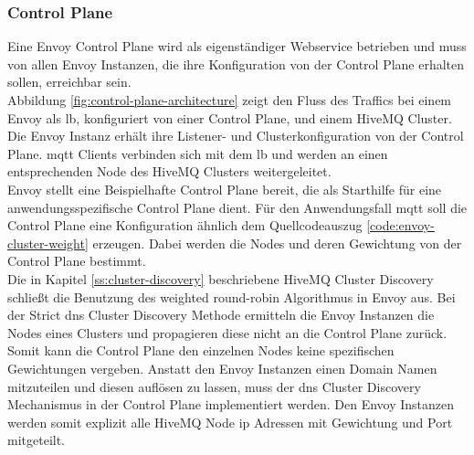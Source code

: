 \subsubsection{Control Plane} \label{ss:control-plane}
Eine Envoy Control Plane wird als eigenständiger Webservice betrieben und muss von allen Envoy Instanzen, die ihre Konfiguration von der Control Plane erhalten sollen, erreichbar sein.
\\
Abbildung \ref{fig:control-plane-architecture} zeigt den Fluss des Traffics bei einem Envoy als \acl{lb}, konfiguriert von einer Control Plane, und einem HiveMQ Cluster. Die Envoy Instanz erhält ihre Listener- und Clusterkonfiguration von der Control Plane. \ac{mqtt} Clients verbinden sich mit dem \ac{lb} und werden an einen entsprechenden Node des HiveMQ Clusters weitergeleitet.
\\
Envoy stellt eine Beispielhafte Control Plane \cite{DynamicConfigurationControl} bereit, die als Starthilfe für eine anwendungsspezifische Control Plane dient. Für den Anwendungsfall \ac{mqtt} soll die Control Plane eine Konfiguration ähnlich dem Quellcodeauszug \ref{code:envoy-cluster-weight} erzeugen. Dabei werden die Nodes und deren Gewichtung von der Control Plane bestimmt.
\\
Die in Kapitel \ref{ss:cluster-discovery} beschriebene HiveMQ Cluster Discovery schlie{\ss}t die Benutzung des weighted round-robin Algorithmus in Envoy aus.
Bei der Strict \ac{dns} Cluster Discovery Methode ermitteln die Envoy Instanzen die Nodes eines Clusters und propagieren diese nicht an die Control Plane zurück. Somit kann die Control Plane den einzelnen Nodes keine spezifischen Gewichtungen vergeben.
Anstatt den Envoy Instanzen einen Domain Namen mitzuteilen und diesen auflösen zu lassen, muss der \ac{dns} Cluster Discovery Mechanismus in der Control Plane implementiert werden. Den Envoy Instanzen werden somit explizit alle HiveMQ Node \ac{ip} Adressen mit Gewichtung und Port mitgeteilt.

